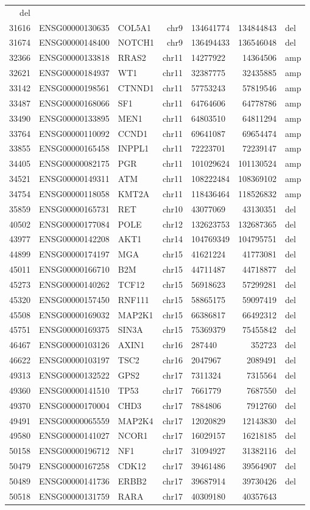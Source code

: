 \documentclass[]{article}
\begin{document}
\begin{longtable}[]{@{}rrlrlrl@{}}
del\tabularnewline
31616 & ENSG00000130635 & COL5A1 & chr9 & 134641774 & 134844843 &
del\tabularnewline
31674 & ENSG00000148400 & NOTCH1 & chr9 & 136494433 & 136546048 &
del\tabularnewline
32366 & ENSG00000133818 & RRAS2 & chr11 & 14277922 & 14364506 &
amp\tabularnewline
32621 & ENSG00000184937 & WT1 & chr11 & 32387775 & 32435885 &
amp\tabularnewline
33142 & ENSG00000198561 & CTNND1 & chr11 & 57753243 & 57819546 &
amp\tabularnewline
33487 & ENSG00000168066 & SF1 & chr11 & 64764606 & 64778786 &
amp\tabularnewline
33490 & ENSG00000133895 & MEN1 & chr11 & 64803510 & 64811294 &
amp\tabularnewline
33764 & ENSG00000110092 & CCND1 & chr11 & 69641087 & 69654474 &
amp\tabularnewline
33855 & ENSG00000165458 & INPPL1 & chr11 & 72223701 & 72239147 &
amp\tabularnewline
34405 & ENSG00000082175 & PGR & chr11 & 101029624 & 101130524 &
amp\tabularnewline
34521 & ENSG00000149311 & ATM & chr11 & 108222484 & 108369102 &
amp\tabularnewline
34754 & ENSG00000118058 & KMT2A & chr11 & 118436464 & 118526832 &
amp\tabularnewline
35859 & ENSG00000165731 & RET & chr10 & 43077069 & 43130351 &
del\tabularnewline
40502 & ENSG00000177084 & POLE & chr12 & 132623753 & 132687365 &
del\tabularnewline
43977 & ENSG00000142208 & AKT1 & chr14 & 104769349 & 104795751 &
del\tabularnewline
44899 & ENSG00000174197 & MGA & chr15 & 41621224 & 41773081 &
del\tabularnewline
45011 & ENSG00000166710 & B2M & chr15 & 44711487 & 44718877 &
del\tabularnewline
45273 & ENSG00000140262 & TCF12 & chr15 & 56918623 & 57299281 &
del\tabularnewline
45320 & ENSG00000157450 & RNF111 & chr15 & 58865175 & 59097419 &
del\tabularnewline
45508 & ENSG00000169032 & MAP2K1 & chr15 & 66386817 & 66492312 &
del\tabularnewline
45751 & ENSG00000169375 & SIN3A & chr15 & 75369379 & 75455842 &
del\tabularnewline
46467 & ENSG00000103126 & AXIN1 & chr16 & 287440 & 352723 &
del\tabularnewline
46622 & ENSG00000103197 & TSC2 & chr16 & 2047967 & 2089491 &
del\tabularnewline
49313 & ENSG00000132522 & GPS2 & chr17 & 7311324 & 7315564 &
del\tabularnewline
49360 & ENSG00000141510 & TP53 & chr17 & 7661779 & 7687550 &
del\tabularnewline
49370 & ENSG00000170004 & CHD3 & chr17 & 7884806 & 7912760 &
del\tabularnewline
49491 & ENSG00000065559 & MAP2K4 & chr17 & 12020829 & 12143830 &
del\tabularnewline
49580 & ENSG00000141027 & NCOR1 & chr17 & 16029157 & 16218185 &
del\tabularnewline
50158 & ENSG00000196712 & NF1 & chr17 & 31094927 & 31382116 &
del\tabularnewline
50479 & ENSG00000167258 & CDK12 & chr17 & 39461486 & 39564907 &
del\tabularnewline
50489 & ENSG00000141736 & ERBB2 & chr17 & 39687914 & 39730426 &
del\tabularnewline
50518 & ENSG00000131759 & RARA & chr17 & 40309180 & 40357643 &

\end{longtable}
\end{document}

